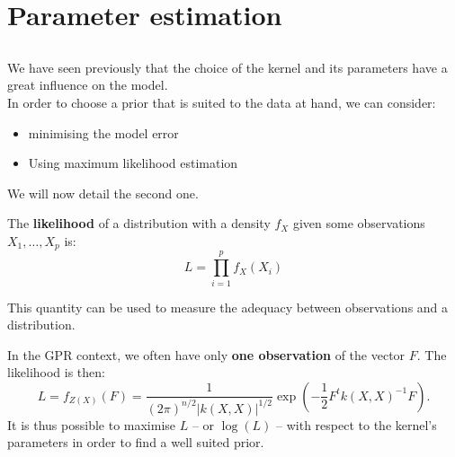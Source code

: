 \documentclass{beamer}
\begin{document}
\section[Param. estim.]{Parameter estimation}
\subsection{}

\begin{frame}{}
We have seen previously that the choice of the kernel and its parameters have a great influence on the model. \\ \vspace{5mm}
In order to choose a prior that is suited to the data at hand, we can consider:
\begin{itemize}
	\item minimising the model error
	\item Using maximum likelihood estimation 
\end{itemize}
We will now detail the second one.
\end{frame}

\begin{frame}{}
\begin{definition}
The \textbf{likelihood} of a distribution with a density $f_X$ given some observations $X_1, \dots,X_p$ is:
\begin{equation*}
 	L = \prod_{i=1}^p f_X(X_i)
\end{equation*} 
\end{definition}
This quantity can be used to measure the adequacy between observations and a distribution.\\ \vspace{3mm}
\end{frame}

\begin{frame}{}
In the GPR context, we often have only \textbf{one observation} of the vector $F$. The likelihood is then:
\begin{equation*}
 	L = f_{Z(X)}(F) = \frac{1}{\displaystyle (2 \pi)^{n/2} |k(X,X)|^{1/2}} \exp \left(-\frac12 F^t k(X,X)^{-1} F  \right).
\end{equation*} 
It is thus possible to maximise $L$ -- or $\log(L)$ -- with respect to the kernel's parameters in order to find a well suited prior. 
\end{frame}
\end{document}
